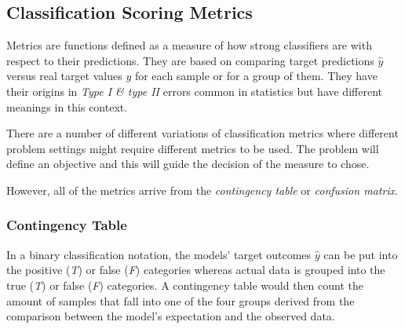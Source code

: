 \subsection{Classification Scoring Metrics}

Metrics are functions defined as a measure of how strong classifiers are with respect to their predictions. They are based on comparing target predictions $\hat{y}$ versus real target values $y$ for each sample or for a group of them. They have their origins in \textit{Type I \& type II} errors common in statistics but have different meanings in this context. 

There are a number of different variations of classification metrics where different problem settings might require different metrics to be used. The problem will define an objective and this will guide the decision of the measure to chose. 

However, all of the metrics arrive from the \textit{contingency table} or \textit{confusion matrix}.

\subsubsection{Contingency Table}

In a binary classification notation, the models' target outcomes $\hat{y}$ can be put into the positive (\textit{T}) or false (\textit{F}) categories whereas actual data is grouped into the true (\textit{T}) or false (\textit{F}) categories. A contingency table would then count the amount of samples that fall into one of the four groups derived from the comparison between the model's expectation and the observed data. 
